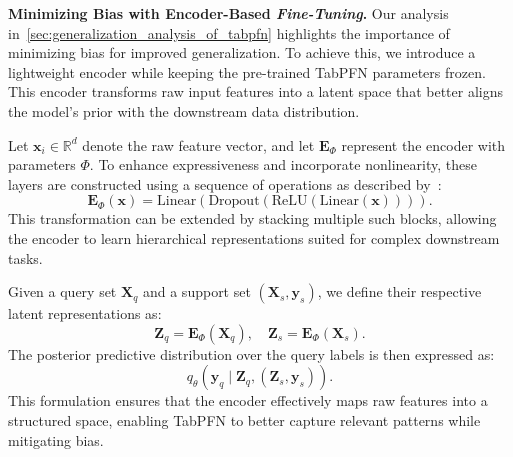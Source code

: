 
\textbf{Minimizing Bias with Encoder-Based {\color{red}\textit{Fine-Tuning}}.}  
Our analysis in~\autoref{sec:generalization_analysis_of_tabpfn} highlights the importance of minimizing bias for improved generalization. To achieve this, we introduce a lightweight encoder while keeping the pre-trained TabPFN parameters frozen. This encoder transforms raw input features into a latent space that better aligns the model’s prior with the downstream data distribution.  

Let \( \boldsymbol{x}_i \in \mathbb{R}^d \) denote the raw feature vector, and let \( \boldsymbol{E}_\Phi \) represent the encoder with parameters \( \Phi \). To enhance expressiveness and incorporate nonlinearity, these layers are constructed using a sequence of operations as described by~\citet{GorishniyRKB21Revisiting}:  
\begin{equation}
\boldsymbol{E}_{\Phi}(\boldsymbol{x}) = \text{Linear}\left( \text{Dropout}\left( \text{ReLU}\left( \text{Linear}\left(\boldsymbol{x} \right) \right) \right)\right).     
\label{eq:encoder}
\end{equation}  
This transformation can be extended by stacking multiple such blocks, allowing the encoder to learn hierarchical representations suited for complex downstream tasks.  

Given a query set \( \boldsymbol{X}_q \) and a support set \( \left( \boldsymbol{X}_{s}, \boldsymbol{y}_{s} \right) \), we define their respective latent representations as:  
\begin{equation}
\boldsymbol{Z}_{q} = \boldsymbol{E}_{\Phi}(\boldsymbol{X}_q), \quad  
\boldsymbol{Z}_{s} = \boldsymbol{E}_{\Phi}(\boldsymbol{X}_s).
\end{equation}  
The posterior predictive distribution over the query labels is then expressed as:  
\begin{equation}
q_\theta\left(\boldsymbol{y}_{q} \mid \boldsymbol{Z}_q, \left(\boldsymbol{Z}_{s},\boldsymbol{y}_{s}\right)\right).
\end{equation}  
This formulation ensures that the encoder effectively maps raw features into a structured space, enabling TabPFN to better capture relevant patterns while mitigating bias.

